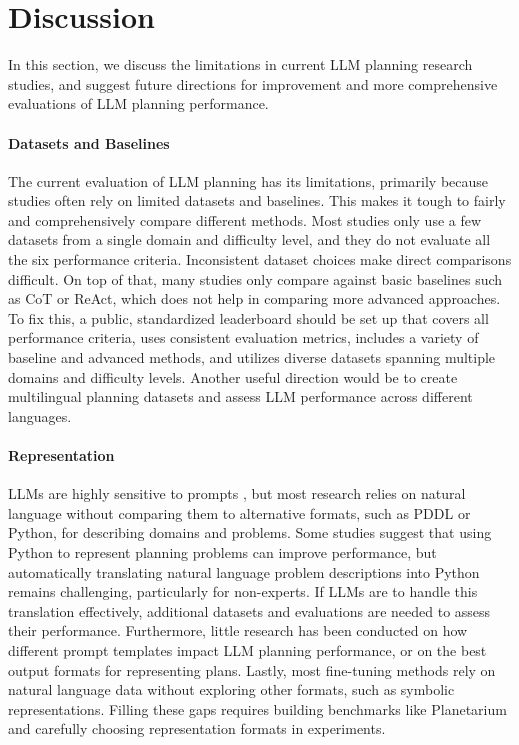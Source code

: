 \vspace{-0.04in}
\section{Discussion}
\label{sec:discussion}

In this section, we discuss the limitations in current LLM planning research studies, and suggest future directions for improvement and more comprehensive evaluations of LLM planning performance.

\vspace{-0.08in}
\paragraph{Datasets and Baselines} The current evaluation of LLM planning has its limitations, primarily because studies often rely on limited datasets and baselines. This makes it tough to fairly and comprehensively compare different methods. Most studies only use a few datasets from a single domain and difficulty level, and they do not evaluate all the six performance criteria. Inconsistent dataset choices make direct comparisons difficult. On top of that, many studies only compare against basic baselines such as CoT or ReAct, which does not help in comparing more advanced approaches. To fix this, a public, standardized leaderboard should be set up that covers all performance criteria, uses consistent evaluation metrics, includes a variety of baseline and advanced methods, and utilizes diverse datasets spanning multiple domains and difficulty levels. Another useful direction would be to create multilingual planning datasets and assess LLM performance across different languages.

\vspace{-0.08in}
\paragraph{Representation}\; LLMs are highly sensitive to prompts \cite{sclar2024quantifyinglanguagemodelssensitivity, razavi2025benchmarkingpromptsensitivitylarge}, but most research relies on natural language without comparing them to alternative formats, such as PDDL or Python, for describing domains and problems. Some studies \cite{singh2023progprompt, aghzal2024look} suggest that using Python to represent planning problems can improve performance, but automatically translating natural language problem descriptions into Python remains challenging, particularly for non-experts. If LLMs are to handle this translation effectively, additional datasets and evaluations are needed to assess their performance. Furthermore, little research has been conducted on how different prompt templates impact LLM planning performance, or on the best output formats for representing plans. Lastly, most fine-tuning methods rely on natural language data without exploring other formats, such as symbolic representations. Filling these gaps requires building benchmarks like Planetarium \cite{zuo2024planetarium} and carefully choosing representation formats in experiments.

